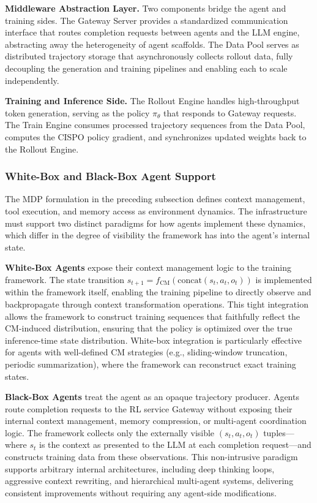 \noindent \textbf{Middleware Abstraction Layer.} Two components bridge the agent and training sides. The Gateway Server provides a standardized communication interface that routes completion requests between agents and the LLM engine, abstracting away the heterogeneity of agent scaffolds. The Data Pool serves as distributed trajectory storage that asynchronously collects rollout data, fully decoupling the generation and training pipelines and enabling each to scale independently.

\noindent \textbf{Training and Inference Side.} The Rollout Engine handles high-throughput token generation, serving as the policy $\pi_\theta$ that responds to Gateway requests. The Train Engine consumes processed trajectory sequences from the Data Pool, computes the CISPO policy gradient, and synchronizes updated weights back to the Rollout Engine.

\subsubsection{White-Box and Black-Box Agent Support}

The MDP formulation in the preceding subsection defines context management, tool execution, and memory access as environment dynamics. The infrastructure must support two distinct paradigms for how agents implement these dynamics, which differ in the degree of visibility the framework has into the agent's internal state.

\noindent \textbf{White-Box Agents} expose their context management logic to the training framework. The state transition $s_{t+1} = f_{\text{CM}}(\mathrm{concat}(s_t, a_t, o_t))$ is implemented within the framework itself, enabling the training pipeline to directly observe and backpropagate through context transformation operations. This tight integration allows the framework to construct training sequences that faithfully reflect the CM-induced distribution, ensuring that the policy is optimized over the true inference-time state distribution. White-box integration is particularly effective for agents with well-defined CM strategies (e.g., sliding-window truncation, periodic summarization), where the framework can reconstruct exact training states.

\noindent \textbf{Black-Box Agents} treat the agent as an opaque trajectory producer. Agents route completion requests to the RL service Gateway without exposing their internal context management, memory compression, or multi-agent coordination logic. The framework collects only the externally visible $(s_t, a_t, o_t)$ tuples---where $s_t$ is the context as presented to the LLM at each completion request---and constructs training data from these observations. This non-intrusive paradigm supports arbitrary internal architectures, including deep thinking loops, aggressive context rewriting, and hierarchical multi-agent systems, delivering consistent improvements without requiring any agent-side modifications.

